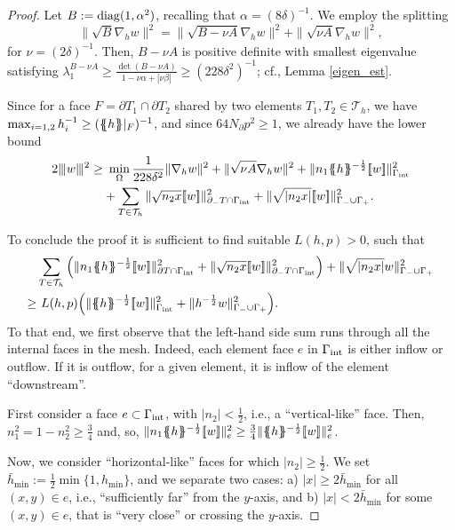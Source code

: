 \documentclass{amsart}
\newcommand{\norm}[2]{\|{#1}\|_{{#2}}}
\newcommand{\jump}[1]{[\kern-0.6mm [{#1}]\kern-0.6mm]}
\newcommand{\av}[1]{\{\kern-1.2mm \{{#1}\}\kern-1.2mm\}}
\newcommand{\su}{\sum_{T \in \Th}}
\newcommand{\Th}{\mathcal{T}_h}
\newcommand{\gint}{\Gamma_{\rm int}}
\newcommand{\gif}{\Gamma_-}
\newcommand{\ndg}[1]{|\kern-.03cm \|{#1}|\kern-.03cm \|}
\newcommand{\avg }[1]{ \av{ #1}}
\newcommand{\barhmin}{\bar{h}_{\min}}
\theoremstyle{definition}
\theoremstyle{remark}
\numberwithin{equation}{section}
\begin{document}
    \begin{proof}
    Let $B:= {\rm diag}(1,\alpha^2)$, recalling that $\alpha=(8\delta)^{-1}$.  We employ the splitting
    \[	\norm{\sqrt{B}\nabla_h w}{}^2
    = \norm{\sqrt{B-\nu A}\nabla_h w}{}^2
    +\norm{\sqrt{\nu A}\nabla _hw}{}^2,
    \]
    for $\nu=(2\delta)^{-1}$. Then, $B-\nu A$ is positive definite with smallest eigenvalue satisfying $\lambda_{1}^{B-\nu A}\ge \frac{\det(B-\nu A)}{1-\nu\alpha + |\nu\beta|}\ge (228\delta^2)^{-1}$; cf., Lemma \ref{eigen_est}.

    Since for a face $F=\partial T_1\cap\partial T_2$ shared by two elements $T_1,T_2\in \Th$, we have $\max_{i=1,2}h_i^{-1}\ge (\avg{h}|_F)^{-1}$, and since $64N_\partial p^2 \ge 1$, we already have the lower bound
    \begin{equation}\label{lower_all}
    \begin{aligned}
 2	\ndg{w}^2\ge &\   \min_\Omega\frac{1}{228\delta^2}  \norm{\nabla_h w}{}^2+\norm{\sqrt{\nu A}\nabla _hw}{}^2 +\norm{n_1\avg{h}^{-\frac{1}{2}}\jump{w}}{\gint }^2\\
& +\su\norm{\sqrt{n_2 x}\jump{w}}{\partial_-T\cap \gint }^2+   \norm{\sqrt{|n_2 x|}\jump{w}}{ \gif\cup\Gamma_+ }^2.
 \end{aligned}
    \end{equation}

To conclude the proof it is sufficient to find suitable $ L(h,p)>0$, such that
\[
\begin{aligned}
&\su \Big( \norm{n_1\avg{h}^{-\frac{1}{2}}\jump{w}}{\partial T\cap \gint }^2 +\norm{\sqrt{n_2 x}\jump{w}}{\partial_-T\cap \gint }^2\Big)+   \norm{\sqrt{|n_2 x|}w}{\gif\cup\Gamma_+ }^2\\
\ge &\  L(h,p) \Big(\norm{\avg{h}^{-\frac{1}{2}}\jump{w}}{ \gint }^2 +\norm{h^{-\frac{1}{2}}w}{ \gif\cup\Gamma_+ }^2 \Big).
\end{aligned}
\]
To that end, we first observe that the left-hand side sum runs through all the internal faces in the mesh. Indeed, each element face $e$ in $\gint$ is either inflow or outflow. If it is outflow, for a given element, it is inflow of the element ``downstream''.

First consider a face $e\subset\gint$, with $|n_2|< \frac{1}{2}$, i.e., a ``vertical-like'' face. Then, $n_1^2=1-n_2^2\ge \frac{3}{4}$ and, so, $\norm{n_1\avg{h}^{-\frac{1}{2}}\jump{w}}{e}^2\ge \frac{3}{4} \norm{\avg{h}^{-\frac{1}{2}}\jump{w}}{e}^2 $.

 Now, we consider  ``horizontal-like'' faces for which $|n_2|\ge \frac{1}{2
}$.
We set $\barhmin:=\frac{1}{2}\min\{1, h_{\min}\}$, and we separate two cases: a) $|x|\ge2\barhmin$ for all $(x,y)\in e$, i.e., ``sufficiently far'' from the $y$-axis, and b) $|x|< 2\barhmin$ for some $(x,y)\in e$, that is ``very close'' or crossing the $y$-axis.



\end{proof}
\end{document}
